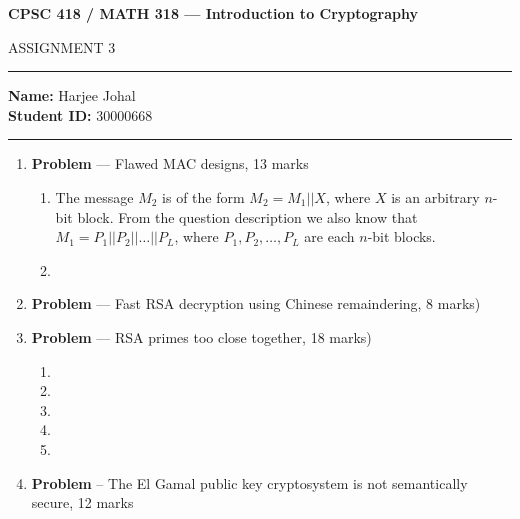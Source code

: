 \documentclass[11pt]{article}
\theoremstyle{definition}
\newcounter{problem}
\begin{document}
\begin{center}
{\bf \Large CPSC 418 / MATH 318 --- Introduction to Cryptography

ASSIGNMENT 3 }
\end{center}

\hrule 	

\textbf{Name:} Harjee Johal \\
\textbf{Student ID:} 30000668

\medskip \hrule

\begin{enumerate} \itemsep 20pt

\item[] \textbf{Problem \theproblem} --- Flawed MAC designs, 13 marks

\begin{enumerate}

\item The message $M_2$ is of the form $M_2 = M_1 || X$, where $X$ is an arbitrary $n$-bit block. From
the question description we also know that $M_1 = P_1 || P_2 || \ldots || P_L$, where $P_1, P_2, \ldots, P_L$ are
each $n$-bit blocks. 

\item %
\end{enumerate}

\newpage

\item[] \textbf{Problem \theproblem} --- Fast RSA decryption using Chinese remaindering, 8
    marks)

\newpage

\item[] \textbf{Problem \theproblem} ---  RSA primes too close together, 18 marks)


\begin{enumerate}
\item %

\item  %

\item  %

\item  %

\item  %

\end{enumerate}

\newpage

\item[] \textbf{Problem \theproblem} -- The El Gamal public key cryptosystem is not
    semantically secure, 12 marks


\end{enumerate}
\end{document}
